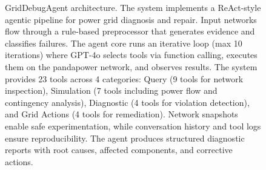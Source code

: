 \begin{figure}[t]
\caption{GridDebugAgent architecture. The system implements a ReAct-style agentic pipeline for power grid diagnosis and repair. Input networks flow through a rule-based preprocessor that generates evidence and classifies failures. The agent core runs an iterative loop (max 10 iterations) where GPT-4o selects tools via function calling, executes them on the pandapower network, and observes results. The system provides 23 tools across 4 categories: Query (9 tools for network inspection), Simulation (7 tools including power flow and contingency analysis), Diagnostic (4 tools for violation detection), and Grid Actions (4 tools for remediation). Network snapshots enable safe experimentation, while conversation history and tool logs ensure reproducibility. The agent produces structured diagnostic reports with root causes, affected components, and corrective actions.}
\label{fig:griddebug_architecture}
\end{figure}
